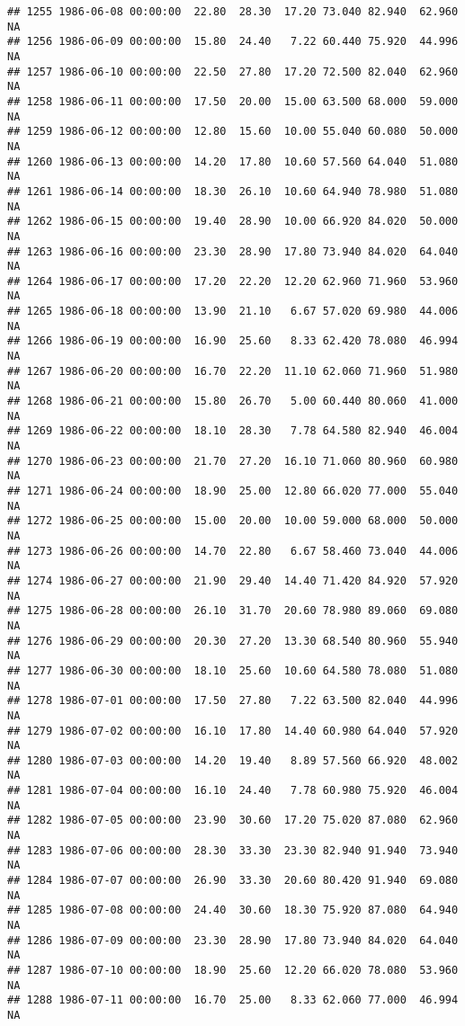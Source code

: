 \documentclass{article}\usepackage{graphicx, color}
\makeatletter
\newenvironment{kframe}{%
 \def\at@end@of@kframe{}%
 \ifinner\ifhmode%
  \def\at@end@of@kframe{\end{minipage}}%
  \begin{minipage}{\columnwidth}%
 \fi\fi%
 \def\FrameCommand##1{\hskip\@totalleftmargin \hskip-\fboxsep
 \colorbox{shadecolor}{##1}\hskip-\fboxsep
     \hskip-\linewidth \hskip-\@totalleftmargin \hskip\columnwidth}%
 \MakeFramed {\advance\hsize-\width
   \@totalleftmargin\z@ \linewidth\hsize
   \@setminipage}}%
 {\par\unskip\endMakeFramed%
 \at@end@of@kframe}
\newenvironment{knitrout}{}{} %
\makeatother
\begin{document}
\begin{knitrout}
\begin{kframe}
\begin{verbatim}
## 1255 1986-06-08 00:00:00  22.80  28.30  17.20 73.040 82.940  62.960     NA
## 1256 1986-06-09 00:00:00  15.80  24.40   7.22 60.440 75.920  44.996     NA
## 1257 1986-06-10 00:00:00  22.50  27.80  17.20 72.500 82.040  62.960     NA
## 1258 1986-06-11 00:00:00  17.50  20.00  15.00 63.500 68.000  59.000     NA
## 1259 1986-06-12 00:00:00  12.80  15.60  10.00 55.040 60.080  50.000     NA
## 1260 1986-06-13 00:00:00  14.20  17.80  10.60 57.560 64.040  51.080     NA
## 1261 1986-06-14 00:00:00  18.30  26.10  10.60 64.940 78.980  51.080     NA
## 1262 1986-06-15 00:00:00  19.40  28.90  10.00 66.920 84.020  50.000     NA
## 1263 1986-06-16 00:00:00  23.30  28.90  17.80 73.940 84.020  64.040     NA
## 1264 1986-06-17 00:00:00  17.20  22.20  12.20 62.960 71.960  53.960     NA
## 1265 1986-06-18 00:00:00  13.90  21.10   6.67 57.020 69.980  44.006     NA
## 1266 1986-06-19 00:00:00  16.90  25.60   8.33 62.420 78.080  46.994     NA
## 1267 1986-06-20 00:00:00  16.70  22.20  11.10 62.060 71.960  51.980     NA
## 1268 1986-06-21 00:00:00  15.80  26.70   5.00 60.440 80.060  41.000     NA
## 1269 1986-06-22 00:00:00  18.10  28.30   7.78 64.580 82.940  46.004     NA
## 1270 1986-06-23 00:00:00  21.70  27.20  16.10 71.060 80.960  60.980     NA
## 1271 1986-06-24 00:00:00  18.90  25.00  12.80 66.020 77.000  55.040     NA
## 1272 1986-06-25 00:00:00  15.00  20.00  10.00 59.000 68.000  50.000     NA
## 1273 1986-06-26 00:00:00  14.70  22.80   6.67 58.460 73.040  44.006     NA
## 1274 1986-06-27 00:00:00  21.90  29.40  14.40 71.420 84.920  57.920     NA
## 1275 1986-06-28 00:00:00  26.10  31.70  20.60 78.980 89.060  69.080     NA
## 1276 1986-06-29 00:00:00  20.30  27.20  13.30 68.540 80.960  55.940     NA
## 1277 1986-06-30 00:00:00  18.10  25.60  10.60 64.580 78.080  51.080     NA
## 1278 1986-07-01 00:00:00  17.50  27.80   7.22 63.500 82.040  44.996     NA
## 1279 1986-07-02 00:00:00  16.10  17.80  14.40 60.980 64.040  57.920     NA
## 1280 1986-07-03 00:00:00  14.20  19.40   8.89 57.560 66.920  48.002     NA
## 1281 1986-07-04 00:00:00  16.10  24.40   7.78 60.980 75.920  46.004     NA
## 1282 1986-07-05 00:00:00  23.90  30.60  17.20 75.020 87.080  62.960     NA
## 1283 1986-07-06 00:00:00  28.30  33.30  23.30 82.940 91.940  73.940     NA
## 1284 1986-07-07 00:00:00  26.90  33.30  20.60 80.420 91.940  69.080     NA
## 1285 1986-07-08 00:00:00  24.40  30.60  18.30 75.920 87.080  64.940     NA
## 1286 1986-07-09 00:00:00  23.30  28.90  17.80 73.940 84.020  64.040     NA
## 1287 1986-07-10 00:00:00  18.90  25.60  12.20 66.020 78.080  53.960     NA
## 1288 1986-07-11 00:00:00  16.70  25.00   8.33 62.060 77.000  46.994     NA

\end{verbatim}
\end{kframe}
\end{knitrout}
\end{document}
